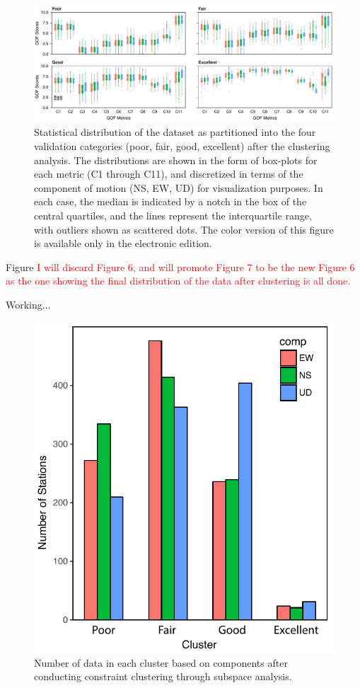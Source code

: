 \begin{figure}
	\centering
	\includegraphics[width=\textwidth]{figures/pdf/figure-06}
	\caption{Statistical distribution of the dataset as partitioned into the four validation categories (poor, fair, good, excellent) after the clustering analysis. The distributions are shown in the form of box-plots for each metric (C1 through C11), and discretized in terms of the component of motion (NS, EW, UD) for visualization purposes. In each case, the median is indicated by a notch in the box of the central quartiles, and the lines represent the interquartile range, with outliers shown as scattered dots. The color version of this figure is available only in the electronic edition.}
	\label{fig:boxed-clusters}
\end{figure}

Figure 
\textcolor{red}{I will discard Figure 6, and will promote Figure 7 to be the new Figure 6 as the one showing the final distribution of the data after clustering is all done.}


Working...

\begin{figure}
	\centering
	\includegraphics[width=\columnwidth]{figures/pdf/Figure_9.pdf}
	\caption{Number of data in each cluster based on components after conducting constraint \kmeans{} clustering through subspace analysis.}
	\label{fig:Figure_cluster_barplot}
\end{figure}

